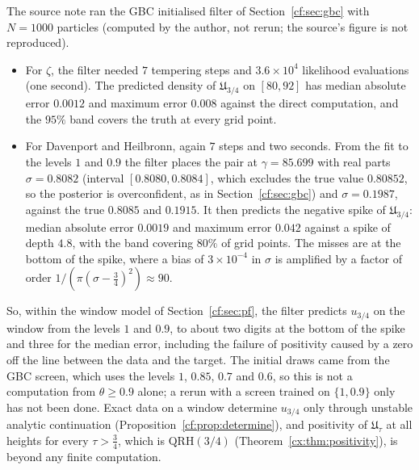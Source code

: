 The source note ran the GBC initialised filter of Section~\ref{cf:sec:gbc} with $N=1000$ particles (computed by the author, not rerun; the source's figure is not reproduced).
\begin{itemize}
\item For $\zeta$, the filter needed $7$ tempering steps and $3.6\times10^4$ likelihood evaluations (one second). The predicted density of $\mathfrak U_{3/4}$ on $[80,92]$ has median absolute error $0.0012$ and maximum error $0.008$ against the direct computation, and the $95\%$ band covers the truth at every grid point.
\item For Davenport and Heilbronn, again $7$ steps and two seconds. From the fit to the levels $1$ and $0.9$ the filter places the pair at $\gamma=85.699$ with real parts $\sigma=0.8082$ (interval $[0.8080,0.8084]$, which excludes the true value $0.80852$, so the posterior is overconfident, as in Section~\ref{cf:sec:gbc}) and $\sigma=0.1987$, against the true $0.8085$ and $0.1915$. It then predicts the negative spike of $\mathfrak U_{3/4}$: median absolute error $0.0019$ and maximum error $0.042$ against a spike of depth $4.8$, with the band covering $80\%$ of grid points. The misses are at the bottom of the spike, where a bias of $3\times10^{-4}$ in $\sigma$ is amplified by a factor of order $1/(\pi(\sigma-\frac34)^2)\approx90$.
\end{itemize}
So, within the window model of Section~\ref{cf:sec:pf}, the filter predicts $u_{3/4}$ on the window from the levels $1$ and $0.9$, to about two digits at the bottom of the spike and three for the median error, including the failure of positivity caused by a zero off the line between the data and the target. The initial draws came from the GBC screen, which uses the levels $1$, $0.85$, $0.7$ and $0.6$, so this is not a computation from $\theta\ge0.9$ alone; a rerun with a screen trained on $\{1,0.9\}$ only has not been done. Exact data on a window determine $u_{3/4}$ only through unstable analytic continuation (Proposition~\ref{cf:prop:determine}), and positivity of $\mathfrak U_\tau$ at all heights for every $\tau>\frac34$, which is $\mathrm{QRH}(3/4)$ (Theorem~\ref{cx:thm:positivity}), is beyond any finite computation.

